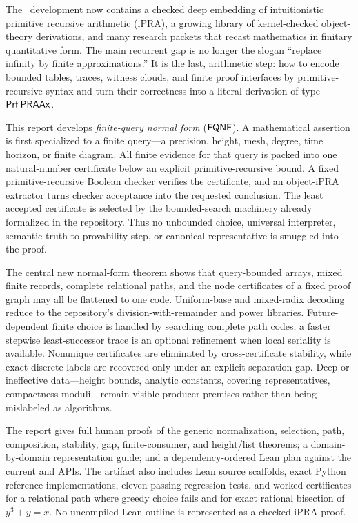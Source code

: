 The \repo\ development now contains a checked deep embedding of intuitionistic
primitive recursive arithmetic (iPRA), a growing library of kernel-checked
object-theory derivations, and many research packets that recast mathematics in
finitary quantitative form.  The main recurrent gap is no longer the slogan
``replace infinity by finite approximations.''  It is the last, arithmetic
step: how to encode bounded tables, traces, witness clouds, and finite proof
interfaces by primitive-recursive syntax and turn their correctness into a
literal derivation of type \(\mathsf{Prf}\,\mathsf{PRAAx}\).

This report develops \emph{finite-query normal form} (\(\mathsf{FQNF}\)).  A
mathematical assertion is first specialized to a finite query---a precision,
height, mesh, degree, time horizon, or finite diagram.  All finite evidence for
that query is packed into one natural-number certificate below an explicit
primitive-recursive bound.  A fixed primitive-recursive Boolean checker
verifies the certificate, and an object-iPRA extractor turns checker acceptance
into the requested conclusion.  The least accepted certificate is selected by
the bounded-search machinery already formalized in the repository.  Thus no
unbounded choice, universal interpreter, semantic truth-to-provability step, or
canonical representative is smuggled into the proof.

The central new normal-form theorem shows that query-bounded arrays, mixed
finite records, complete relational paths, and the node certificates of a fixed
proof graph may all be flattened to one code.  Uniform-base and mixed-radix
decoding reduce to the repository's division-with-remainder and power
libraries.  Future-dependent finite choice is handled by searching complete
path codes; a faster stepwise least-successor trace is an optional refinement
when local seriality is available.  Nonunique certificates are eliminated by
cross-certificate stability, while exact discrete labels are recovered only
under an explicit separation gap.  Deep or ineffective data---height bounds,
analytic constants, covering representatives, compactness moduli---remain
visible producer premises rather than being mislabeled as algorithms.

The report gives full human proofs of the generic normalization, selection,
path, composition, stability, gap, finite-consumer, and height/list theorems; a
domain-by-domain representation guide; and a dependency-ordered Lean plan
against the current  and  APIs.  The
artifact also includes Lean source scaffolds, exact Python reference
implementations, eleven passing regression tests, and worked certificates for
a relational path where greedy choice fails and for exact rational bisection of
\(y^3+y=x\).  No uncompiled Lean outline is represented as a checked iPRA
proof.
